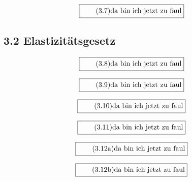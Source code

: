 \documentclass[11pt]{article}
\newcommand{\1}{ {\mathds{1}} }
\begin{document}
    \begin{equation}
      \boxed{
        \tag{3.7}
        \begin{split}
          \text{da bin ich jetzt zu faul}
        \end{split}
      }
    \end{equation}

    \subsection*{3.2 Elastizitätsgesetz}

    \begin{equation}
      \boxed{
        \tag{3.8}
        \begin{split}
          \text{da bin ich jetzt zu faul}
        \end{split}
      }
    \end{equation}

    \begin{equation}
      \boxed{
        \tag{3.9}
        \begin{split}
          \text{da bin ich jetzt zu faul}
        \end{split}
      }
    \end{equation}

    \begin{equation}
      \boxed{
        \tag{3.10}
        \begin{split}
          \text{da bin ich jetzt zu faul}
        \end{split}
      }
    \end{equation}

    \begin{equation}
      \boxed{
        \tag{3.11}
        \begin{split}
          \text{da bin ich jetzt zu faul}
        \end{split}
      }
    \end{equation}

    \begin{equation}
      \boxed{
        \tag{3.12a}
        \begin{split}
          \text{da bin ich jetzt zu faul}
        \end{split}
      }
    \end{equation}

    \begin{equation}
      \boxed{
        \tag{3.12b}
        \begin{split}
          \text{da bin ich jetzt zu faul}
        \end{split}
      }
    \end{equation}
\end{document}
